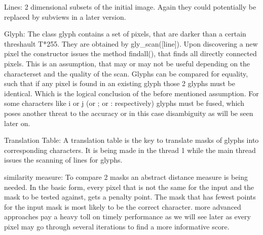 Lines: 2 dimensional subsets of the initial image. Again they could potentially be replaced by subviews in a later version.\newline

Glyph: The class glyph contains a set of pixels, that are darker than a certain threshault T*255. They are obtained by gly_scan([line]). Upon discovering a new pixel the constructor issues the method findall(), that finds all directly connected pixels. This is an assumption, that may or may not be useful depending on the characterset and the quality of the scan.\newline
Glyphs can be compared for equality, such that if any pixel is found in an existing glyph those 2 glyphs must be identical. Which is the logical conclusion of the before mentioned assumption.\newline
For some characters like i or j (or ; or : respectively) glyphs must be fused, which poses another threat to the accuracy or in this case disambiguity as will be seen later on.\newline

Translation Table: A translation table is the key to translate masks of glyphs into corresponding characters. It is being made in the thread 1 while the main thread issues the scanning of lines for glyphs.

similarity measure: To compare 2 masks an abstract distance measure is being needed. In the basic form, every pixel that is not the same for the input and the mask to be tested against, gets a penalty point. The mask that has fewest points for the input mask is most likely to be the correct character.\newline
more advanced approaches pay a heavy toll on timely performance as we will see later as every pixel may go through several iterations to find a more informative score.\newline



